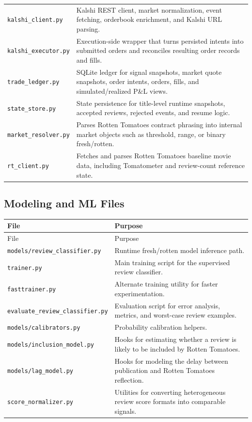 \documentclass[11pt]{article}
\begin{document}
\begin{longtable}{>{\ttfamily}p{}p{}}
\textnormal{\texttt{kalshi\_client.py}} & Kalshi REST client, market normalization, event fetching, orderbook enrichment, and Kalshi URL parsing. \\
\textnormal{\texttt{kalshi\_executor.py}} & Execution-side wrapper that turns persisted intents into submitted orders and reconciles resulting order records and fills. \\
\textnormal{\texttt{trade\_ledger.py}} & SQLite ledger for signal snapshots, market quote snapshots, order intents, orders, fills, and simulated/realized P\&L views. \\
\textnormal{\texttt{state\_store.py}} & State persistence for title-level runtime snapshots, accepted reviews, rejected events, and resume logic. \\
\textnormal{\texttt{market\_resolver.py}} & Parses Rotten Tomatoes contract phrasing into internal market objects such as threshold, range, or binary fresh/rotten. \\
\textnormal{\texttt{rt\_client.py}} & Fetches and parses Rotten Tomatoes baseline movie data, including Tomatometer and review-count reference state. \\
\bottomrule
\end{longtable}

\subsection{Modeling and ML Files}
\begin{longtable}{>{\ttfamily}p{}p{}}
\toprule
File & Purpose \\
\midrule
\endfirsthead
\toprule
File & Purpose \\
\midrule
\endhead
\textnormal{\texttt{models/review\_classifier.py}} & Runtime fresh/rotten model inference path. \\
\textnormal{\texttt{trainer.py}} & Main training script for the supervised review classifier. \\
\textnormal{\texttt{fasttrainer.py}} & Alternate training utility for faster experimentation. \\
\textnormal{\texttt{evaluate\_review\_classifier.py}} & Evaluation script for error analysis, metrics, and worst-case review examples. \\
\textnormal{\texttt{models/calibrators.py}} & Probability calibration helpers. \\
\textnormal{\texttt{models/inclusion\_model.py}} & Hooks for estimating whether a review is likely to be included by Rotten Tomatoes. \\
\textnormal{\texttt{models/lag\_model.py}} & Hooks for modeling the delay between publication and Rotten Tomatoes reflection. \\
\textnormal{\texttt{score\_normalizer.py}} & Utilities for converting heterogeneous review score formats into comparable signals. \\
\bottomrule
\end{longtable}
\end{document}
